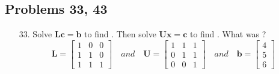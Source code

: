 \begin{itemize}
\begin{enumerate}
    \end{enumerate}

    \subsection{Problems 33, 43}\color{foreground-2}
    \begin{itemize}
      \item[33.] Solve \(\bm{Lc} = \bm{b}\) to find . Then solve \(\bm{Ux} =
        \bm{c}\) to find . What was ?
        \[%
        \bm{L} = \begin{bmatrix}
        1 & 0 & 0 \\
        1 & 1 & 0 \\
        1 & 1 & 1
        \end{bmatrix}\quad and \quad
        \bm{U} = \begin{bmatrix}
        1 & 1 & 1 \\
        0 & 1 & 1 \\
        0 & 0 & 1
        \end{bmatrix} \quad and \quad
        \bm{b} = \begin{bmatrix} 4 \\ 5 \\ 6 \end{bmatrix}
        \]%


\end{itemize}
\end{itemize}
